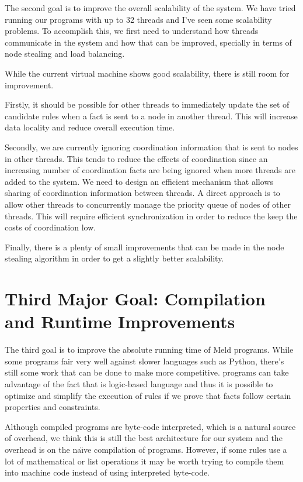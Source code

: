 The second goal is to improve the overall scalability of the system. We have tried running our programs with up to 32 threads and I've seen
some scalability problems. To accomplish this, we first need to understand how
threads communicate in the system and how that can be improved, specially in terms of node stealing and load balancing.

While the current virtual machine shows good scalability, there is still room for improvement.

Firstly, it should be possible for other threads to immediately update the set of candidate rules when a fact
is sent to a node in another thread. This will increase data locality and reduce overall execution time.

Secondly, we are currently ignoring coordination information that is sent to nodes in other threads.
This tends to reduce the effects of coordination since an increasing number of
coordination facts are being ignored when more threads are added to the system. We need to design an efficient mechanism that allows sharing of coordination
information between threads. A direct approach is to allow other threads to concurrently manage the priority queue of nodes
of other threads. This will require efficient synchronization in order to reduce the keep the costs of coordination low.

Finally, there is a plenty of small improvements that can be made in the node stealing algorithm in order to
get a slightly better scalability.

\section{Third Major Goal: Compilation and Runtime Improvements}

The third goal is to improve the absolute running time of Meld programs. While some programs fair very well against slower languages such as Python,
there's still some work that can be done to make \lang more competitive. \lang programs can take advantage of the fact that
\lang is logic-based language and thus it is possible to optimize and simplify the execution of rules
if we prove that facts follow certain properties and constraints.

Although compiled \lang programs are byte-code interpreted, which is a natural
source of overhead, we think this is still the best architecture for our system and the overhead
is on the na\"{\i}ve compilation of programs. However, 
if some rules use a lot of mathematical or list operations it may be worth trying to compile them into machine code instead of using interpreted byte-code.

